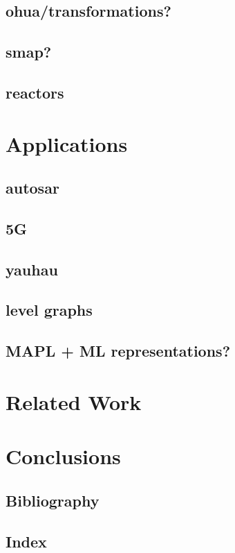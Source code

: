 \documentclass{report}
\begin{document}
\section{ohua/transformations?}
 
\section{smap?}

\section{reactors}

\chapter{Applications}

\section{autosar}
\section{5G}
\section{yauhau}
\section{level graphs}
\section{MAPL + ML representations?}

\chapter{Related Work}


\chapter{Conclusions} 


\section*{Bibliography} 
\section*{Index} 
\end{document}
